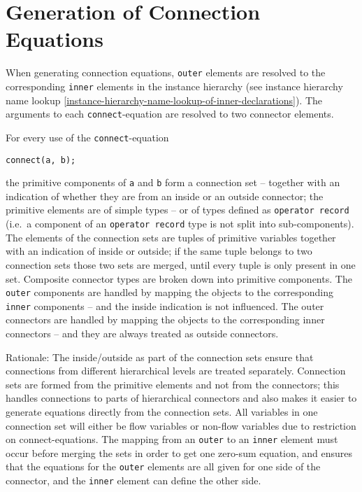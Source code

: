 \section{Generation of Connection Equations}

When generating connection equations, \lstinline!outer! elements are resolved to the
corresponding \lstinline!inner! elements in the instance hierarchy (see instance
hierarchy name lookup \autoref{instance-hierarchy-name-lookup-of-inner-declarations}). The arguments to each \lstinline!connect!-equation are
resolved to two connector elements.

For every use of the \lstinline!connect!-equation
\begin{lstlisting}[language=modelica]
connect(a, b);
\end{lstlisting}

the primitive components of \lstinline!a! and \lstinline!b! form a connection set -- together
with an indication of whether they are from an inside or an outside
connector; the primitive elements are of simple types -- or of types
defined as \lstinline!operator record! (i.e.\ a component of an \lstinline!operator record! type
is not split into sub-components). The elements of the connection sets
are tuples of primitive variables together with an indication of inside
or outside; if the same tuple belongs to two connection sets those two
sets are merged, until every tuple is only present in one set. Composite
connector types are broken down into primitive components. The \lstinline!outer!
components are handled by mapping the objects to the corresponding \lstinline!inner!
components -- and the inside indication is not influenced. The outer
connectors are handled by mapping the objects to the corresponding inner
connectors -- and they are always treated as outside connectors.

\begin{nonnormative}
Rationale: The inside/outside as part of the connection sets
ensure that connections from different hierarchical levels are treated
separately. Connection sets are formed from the primitive elements and
not from the connectors; this handles connections to parts of
hierarchical connectors and also makes it easier to generate equations
directly from the connection sets. All variables in one connection set
will either be flow variables or non-flow variables due to restriction
on connect-equations. The mapping from an \lstinline!outer! to an \lstinline!inner!
element must occur before merging the sets in order to get one
zero-sum equation, and ensures that the equations for the \lstinline!outer!
elements are all given for one side of the connector, and the
\lstinline!inner! element can define the other side.
\end{nonnormative}

